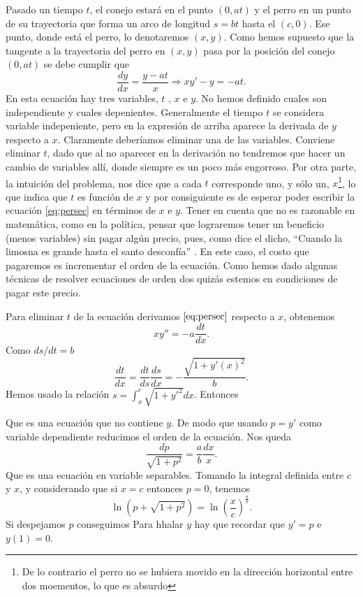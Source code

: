 Pasado un tiempo $t$, el conejo estará en el punto $(0,at)$ y el perro en un punto de su trayectoria que forma un arco de
 longitud $s=bt$ hasta el $(c,0)$. Ese punto, donde está el perro, lo denotaremos $(x,y)$. Como hemos supuesto que la tangente a la trayectoria del perro en $(x,y)$ pasa
 por la posición del conejo $(0,at)$ se debe cumplir que
 \begin{equation}\label{eq:persec}\frac{dy}{dx}=\frac{y-at}{x}\Longrightarrow xy'-y=-at.\end{equation}
 En esta ecuación hay tres variables, $t$ , $x$ e $y$. No hemos definido cuales son independiente y cuales depenientes.   Generalmente el tiempo $t$ se considera  variable  indepeniente, pero en la expresión de arriba aparece la derivada de $y$ respecto a $x$.
 Claramente deberíamos eliminar una de las variables. Conviene eliminar $t$, dado que al no aparecer en la derivación no tendremos que hacer un cambio de variables allí, donde siempre es un poco más engorroso.   Por otra parte, la intuición del problema, nos dice que  a cada $t$ corresponde uno, y sólo un, $x$\footnote{De lo contrario el perro no se hubiera movido en la dirección horizontal entre dos moementos, lo que es absurdo}, lo que indica que $t$ es función de $x$ y por consiguiente es de esperar poder escribir la ecuación \eqref{eq:persec} en términos de $x$ e $y$.   Tener en cuenta que no es  razonable en matemática, como en la política,  pensar que lograremos tener un beneficio (menos variables) sin pagar algún precio, pues, como dice el dicho,
 ``Cuando la limosna es grande hasta el santo desconfía'' .
 En este caso, el costo que pagaremos
 es incrementar el orden de la ecuación.
 Como hemos dado algunas técnicas de  resolver ecuaciones de orden dos quizás estemos en condiciones de pagar este precio.

Para eliminar $t$ de la ecuación derivamos $\eqref{eq:persec}$ respecto a $x$, obtenemos
\[xy''=-a\frac{dt}{dx}.\]
Como $ds/dt=b$
\[\frac{dt}{dx}=\frac{dt}{ds}\frac{ds}{dx}=-\frac{\sqrt{1+y'(x)^2}}{b}.\]
Hemos usado la relación $s=\int_x^c\sqrt{1+y'^2}dx$.
 Entonces

Que es una ecuación que no contiene $y$. De modo que usando $p=y'$ como variable dependiente reducimos el orden de la ecuación. Nos queda
\[\frac{dp}{\sqrt{1+p^2}}=\frac{a}{b}\frac{dx}{x}.\]
Que es una ecuación en variable separables. Tomando la integral definida entre $c$ y $x$, y considerando que si $x=c$ entonces $p=0$, tenemos
\[\ln\left(p+\sqrt{1+p^2}\right)=\ln\left( \frac{x}{c}\right)^{\tfrac{a}{b}}.\]
 Si despejamos $p$ conseguimos
Para hhalar $y$ hay que recordar que $y'=p$ e $y(1)=0$.

